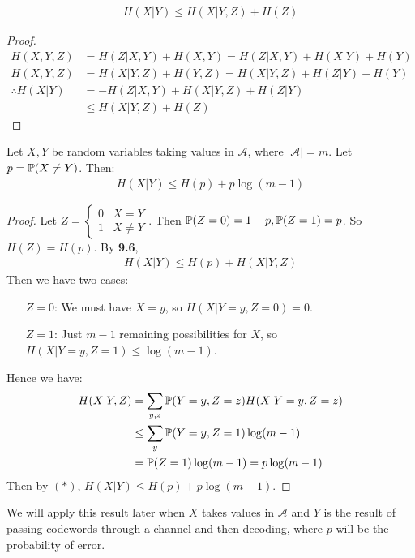 \documentclass[10pt,a4paper]{article}
\begin{document}
\begin{lemma}
\begin{align*}
H(X|Y) \leq H(X|Y, Z) + H(Z)
\end{align*}
\end{lemma}
\begin{proof}
\begin{align*}
H(X,Y,Z) &= H(Z|X,Y) + H(X,Y) = H(Z | X, Y) + H(X|Y) + H(Y)\\
H(X,Y,Z) &= H(X|Y,Z) + H(Y,Z) = H(X|Y, Z) + H(Z|Y) + H(Y)\\
\therefore H(X|Y) &= -H(Z|X,Y) + H(X|Y,Z) + H(Z|Y)\\
&\leq H(X|Y,Z) + H(Z) 
\end{align*}
\end{proof}
\begin{proposition}
Let $X,Y$ be random variables taking values in $\mathscr{A}$, where $|\mathscr{A}| = m$. Let $p = \P(X\neq Y)$. Then:
\begin{align*}
H(X|Y) \leq H(p) + p \log(m-1)
\end{align*}
\end{proposition}
\begin{proof}
Let $Z = \begin{cases} 0 & X = Y \\ 1 & X \neq Y\end{cases}$. Then $\P(Z=0) = 1-p, \P(Z=1) = p$. So $H(Z) = H(p)$. By \textbf{9.6},
\begin{align*}
H(X|Y) \leq H(p) + H(X|Y,Z)\tag{\ast}
\end{align*}
Then we have two cases:
\begin{itemize}
\item[$Z=0$:] We must have $X=y$, so $H(X|Y=y, Z=0) = 0$.
\item[$Z=1$:] Just $m-1$ remaining possibilities for $X$, so $H(X|Y=y, Z=1) \leq \log(m-1)$.
\end{itemize}
Hence we have:
\begin{align*}
H(X|Y,Z) &= \sum_{y,z} \P(Y=y, Z=z)H(X|Y=y,Z=z)\\
&\leq \sum_y \P(Y=y, Z=1)\log(m-1)\\
&= \P(Z=1)\log(m-1) = p\log(m-1)
\end{align*}
Then by $(\ast)$, $H(X|Y) \leq H(p) + p \log(m-1)$.
\end{proof}
We will apply this result later when $X$ takes values in $\mathscr{A}$ and $Y$ is the result of passing codewords through a channel and then decoding, where $p$ will be the probability of error.
\end{document}
